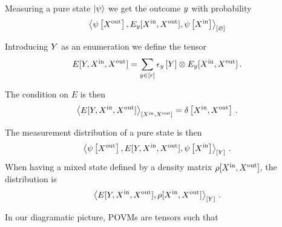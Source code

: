 Measuring a pure state $\ket{\psi}$ we get the outcome $y$ with probability
\begin{align*}
    \left\langle \psi\left[X^{\mathrm{out}}\right],E_y[X^{\mathrm{in}},X^{\mathrm{out}}],\psi\left[X^{\mathrm{in}}\right]\right\rangle_{\left[ \varnothing \right]}
\end{align*}

Introducing $Y$ as an enumeration we define the tensor
\begin{align*}
    E[Y,X^{\mathrm{in}},X^{\mathrm{out}}]
    = \sum_{y\in[r]} \epsilon_{y}\left[Y\right] \otimes E_y[X^{\mathrm{in}},X^{\mathrm{out}}] \, .
\end{align*}

The condition on $E$ is then
\begin{align*}
    \left\langle E[Y,X^{\mathrm{in}},X^{\mathrm{out}}]\right\rangle_{\left[ X^{\mathrm{in}},X^{\mathrm{out}} \right]}
    = \delta\left[X^{\mathrm{in}},X^{\mathrm{out}}\right] \, .
\end{align*}

The measurement distribution of a pure state is then
\begin{align*}
    \left\langle \psi\left[X^{\mathrm{out}}\right],E[Y,X^{\mathrm{in}},X^{\mathrm{out}}],\psi\left[X^{\mathrm{in}}\right]\right\rangle_{\left[ Y \right]} \, .
\end{align*}
When having a mixed state defined by a density matrix $\rho[X^{\mathrm{in}},X^{\mathrm{out}}]$, the distribution is
\begin{align*}
    \left\langle E[Y,X^{\mathrm{in}},X^{\mathrm{out}}],\rho[X^{\mathrm{in}},X^{\mathrm{out}}]\right\rangle_{\left[ Y \right]} \, .
\end{align*}



In our diagramatic picture, POVMs are tensors
such that

